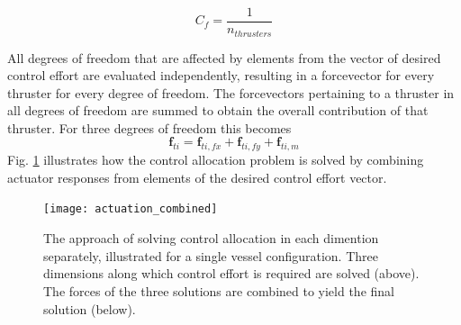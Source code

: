 \begin{equation}
C_{f} = \frac{1}{n_{thrusters}}
\end{equation}


All degrees of freedom that are affected by elements from the vector of desired control effort are evaluated independently, resulting in a forcevector for every thruster for every degree of freedom. The forcevectors pertaining to a thruster in all degrees of freedom are summed to obtain the overall contribution of that thruster. For three degrees of freedom this becomes
\begin{equation}
	\textbf{f}_{ti} = \textbf{f}_{ti,fx} + \textbf{f}_{ti,fy} + \textbf{f}_{ti,m}
\end{equation}
Fig. \ref{fig:controlAllocationSeparate1} illustrates how the control allocation problem is solved by combining actuator responses from elements of the desired control effort vector. 

\begin{figure}[H]
\centering
\texttt{[image: actuation\_combined]}
\caption{The approach of solving control allocation in each dimention separately, illustrated for a single vessel configuration. Three dimensions along which control effort is required are solved (above). The forces of the three solutions are combined to yield the final solution (below). }
\label{fig:controlAllocationSeparate1}
\end{figure}

